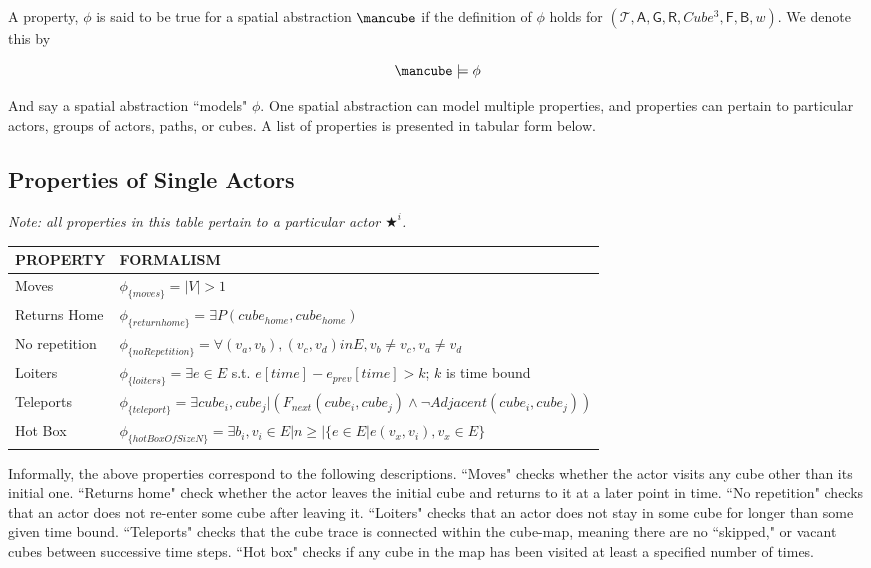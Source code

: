 A property, $\phi$ is said to be true for a spatial abstraction $\cube$ if the definition of $\phi$ holds for $(\mathcal{T}, \mathsf{A}, \mathsf{G}, \mathsf{R}, Cube^3, \mathsf{F}, \mathsf{B}, w)$.
We denote this by 

\begin{equation}
  \cube \models \phi
\end{equation}

And say a spatial abstraction ``models" $\phi$.
One spatial abstraction can model multiple properties, and properties can pertain to particular actors, groups of actors, paths, or cubes.
A list of properties is presented in tabular form below.

\subsection{Properties of Single Actors}

\emph{Note: all properties in this table pertain to a particular actor $\bigstar^i$.}
\begin{tabular}{| p{2.8cm} | p{11.5cm} | }
\hline
PROPERTY & FORMALISM \\ \hline
Moves & $\phi_{\{moves\}} = |V| > 1$ \\ \hline
Returns Home & $\phi_{\{returnhome\}} = \exists P(cube_{home}, cube_{home})$ \\ \hline
No repetition & $\phi_{\{noRepetition\}} = \forall (v_a, v_b), (v_c,v_d) in E, v_b \neq v_c, v_a \neq v_d$ \\ \hline
 Loiters & $\phi_{\{loiters\}} =  \exists e \in E$ s.t. $e[time] - e_{prev}[time] > k$; $k$ is time bound \\ \hline
Teleports & $\phi_{\{teleport\}}=  \exists  cube_i, cube_j | (F_{next}(cube_i, cube_j) \land \lnot Adjacent(cube_i, cube_j))$ \\ \hline
Hot Box & $\phi_{\{hotBoxOfSizeN\}} = \exists b_i, v_i \in E | n \geq |\{e \in E | e(v_x, v_i), v_x \in E\}$ \\ \hline
\end{tabular}

Informally, the above properties correspond to the following descriptions.
``Moves" checks whether the actor visits any cube other than its initial one.
``Returns home" check whether the actor leaves the initial cube and returns to it at a later point in time.
``No repetition" checks that an actor does not re-enter some cube after leaving it.
``Loiters" checks that an actor does not stay in some cube for longer than some given time bound.
``Teleports" checks that the cube trace is connected within the cube-map, meaning there are no ``skipped," or vacant cubes between successive time steps.
``Hot box" checks if any cube in the map has been visited at least a specified number of times.


